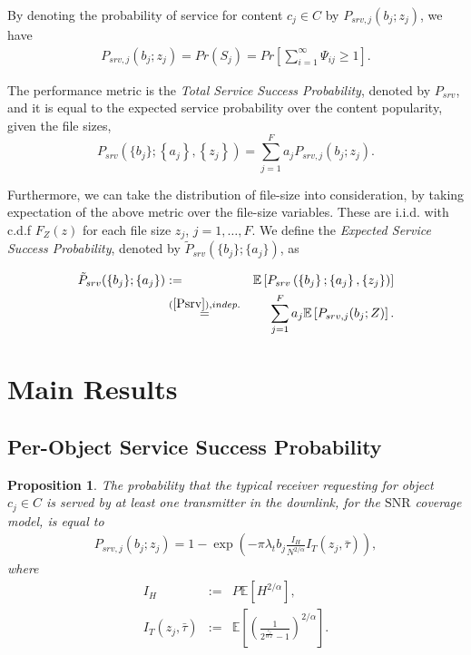 \documentclass[conference]{IEEEtran}
\newtheorem{Pro}{Proposition}
\begin{document}
By denoting the probability of service for content $c_j\in C$ by $P_{srv,j}(b_j;z_j)$, we have
\begin{eqnarray}
\label{Pservj}
P_{srv,j}(b_j;z_j) = Pr(S_j) = Pr\left[\sum_{i=1}^{\infty} \Psi_{ij} \geq 1\right].
\end{eqnarray}


The performance metric is the \textit{Total Service Success Probability}, denoted by $P_{srv}$, and it is equal to the expected service probability over the content popularity, given the file sizes,
\begin{equation}
\label{Psrv}
 P_{srv}\left(\{b_j\};\left\{a_j\right\},\left\{z_j\right\}\right)= \sum_{j=1}^{F} a_j P_{srv,j}(b_j;z_j).
\end{equation}

Furthermore, we can take the distribution of file-size into consideration, by taking expectation of the above metric over the file-size variables. These are i.i.d. with c.d.f $F_Z(z)$ for each file size $z_j$, $j=1,\ldots,F$. We define the \textit{Expected Service Success Probability}, denoted by $\tilde{P}_{srv}(\{b_j\};\{a_j\})$, as

\begin{eqnarray}
\label{expPsrv}
\tilde{P}_{srv}(\{b_j\};\{a_j\}) & := & \mathbb{E}\left[P_{srv}\left(\left\{b_j\right\};\left\{a_j\right\},\left\{z_j\right\}\right)\right]\nonumber\\
& \stackrel{(\ref{Psrv}),indep.}{=} & \sum_{j=1}^{F} a_j \mathbb{E}\left[P_{srv,j}(b_j;Z)\right].
\end{eqnarray}




\section{Main Results}
\label{secIV}

\subsection{Per-Object Service Success Probability}

\begin{Pro} 
\label{Prop1}
The probability that the typical receiver requesting for object $c_j \in C$ is served by at least one transmitter in the downlink, for the $\mathrm{SNR}$ coverage model, is equal to
\begin{eqnarray}
\label{Psrvj}
P_{srv,j}(b_j;z_j) = 1 - \exp\left(-\pi \lambda_t b_j  \frac{I_H}{N^{2/ \alpha}} I_{T}(z_j,\bar{\tau}) \right),
\end{eqnarray}
where 
\begin{eqnarray}
\label{Eh}
I_H & := & P\mathbb{E}[H^{2/ \alpha}],\\
\label{Et}
I_{T}(z_j,\bar{\tau}) & := & \mathbb{E}[(\frac {1} {2^{\frac{z_j}{W T}}-1})^{2/ \alpha}].
\end{eqnarray}
\end{Pro}
\end{document}
